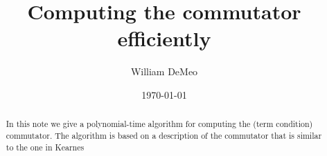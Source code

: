 



\usepackage{inputs/macros}



\title{Computing the commutator efficiently}
\date{\today}
\author[W.~DeMeo]{William DeMeo}
\address{University of Hawaii}


\maketitle

\renewcommand{\etaR}{\ensuremath{\eta}}



\begin{abstract}
  In this note we give a polynomial-time algorithm for computing the
  (term condition) commutator. The algorithm is based on 
  a description of the commutator that is
  similar to the one in Kearnes~\cite[p.~930]{MR1358491}
\end{abstract}


